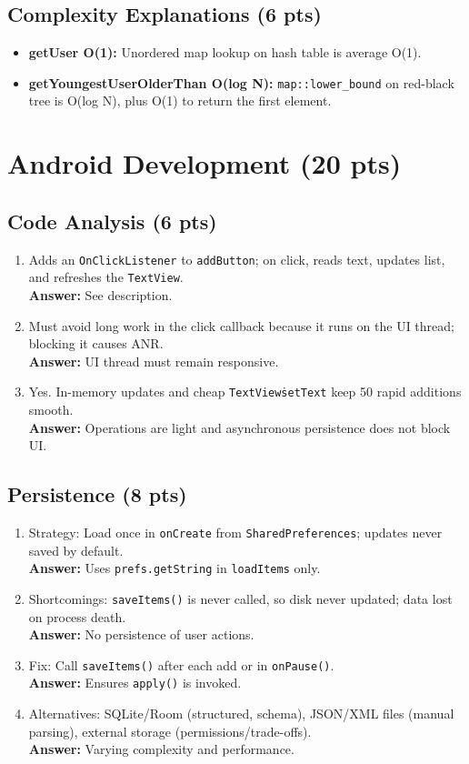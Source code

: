\documentclass[12pt]{article}
\begin{document}
\subsection{Complexity Explanations (6 pts)}
\begin{itemize}
\item \textbf{getUser O(1):} Unordered map lookup on hash table is average O(1).
\item \textbf{getYoungestUserOlderThan O(log N):} \texttt{map::lower\_bound} on red-black tree is O(log N), plus O(1) to return the first element.
\end{itemize}

\section{Android Development (20 pts)}
\subsection{Code Analysis (6 pts)}
\begin{enumerate}[label=6.1.\arabic*.]
\item Adds an \texttt{OnClickListener} to \texttt{addButton}; on click, reads text, updates list, and refreshes the \texttt{TextView}.\\
\textbf{Answer:} See description.
\item Must avoid long work in the click callback because it runs on the UI thread; blocking it causes ANR.\\
\textbf{Answer:} UI thread must remain responsive.
\item Yes. In-memory updates and cheap \texttt{TextView\.setText} keep 50 rapid additions smooth.\\
\textbf{Answer:} Operations are light and asynchronous persistence does not block UI.
\end{enumerate}

\subsection{Persistence (8 pts)}
\begin{enumerate}[label=6.2.\arabic*.]
\item Strategy: Load once in \texttt{onCreate} from \texttt{SharedPreferences}; updates never saved by default.\\
\textbf{Answer:} Uses \texttt{prefs.getString} in \texttt{loadItems} only.
\item Shortcomings: \texttt{saveItems()} is never called, so disk never updated; data lost on process death.\\
\textbf{Answer:} No persistence of user actions.
\item Fix: Call \texttt{saveItems()} after each add or in \texttt{onPause()}.\\
\textbf{Answer:} Ensures \texttt{apply()} is invoked.
\item Alternatives: SQLite/Room (structured, schema), JSON/XML files (manual parsing), external storage (permissions/trade-offs).\\
\textbf{Answer:} Varying complexity and performance.
\end{enumerate}
\end{document}
